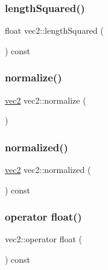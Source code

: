 \mbox{\label{structvec2_a4bd69636a40be9fe1949d1a3e4b1ff50}} 
\subsubsection{\texorpdfstring{length\+Squared()}{lengthSquared()}}
{\footnotesize\ttfamily float vec2\+::length\+Squared (\begin{DoxyParamCaption}{ }\end{DoxyParamCaption}) const}

\mbox{\label{structvec2_acfc20e9984f37b033b8ace687823700c}} 
\subsubsection{\texorpdfstring{normalize()}{normalize()}}
{\footnotesize\ttfamily \hyperlink{structvec2}{vec2} vec2\+::normalize (\begin{DoxyParamCaption}{ }\end{DoxyParamCaption})}

\mbox{\label{structvec2_acb4a4c9ee8c1d81e6e51b1251e0c1f69}} 
\subsubsection{\texorpdfstring{normalized()}{normalized()}}
{\footnotesize\ttfamily \hyperlink{structvec2}{vec2} vec2\+::normalized (\begin{DoxyParamCaption}{ }\end{DoxyParamCaption}) const}

\mbox{\label{structvec2_a04106d6297826f99ad1eb28f2b4eb564}} 
\subsubsection{\texorpdfstring{operator float()}{operator float()}}
{\footnotesize\ttfamily vec2\+::operator float (\begin{DoxyParamCaption}{ }\end{DoxyParamCaption}) const}

